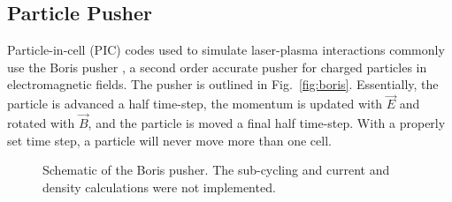 \documentclass[]{article}
\begin{document}
\subsection{Particle Pusher}
Particle-in-cell (PIC) codes used to simulate laser-plasma interactions commonly use the Boris pusher \cite{bird}, a second order accurate pusher for charged particles in electromagnetic fields.  The pusher is outlined in Fig.~\ref{fig:boris}.  Essentially, the particle is advanced a half time-step, the momentum is updated with $\vec{E}$ and rotated with $\vec{B}$, and the particle is moved a final half time-step.  With a properly set time step, a particle will never move more than one cell.


\begin{figure}[htbp]
\centering
\caption{Schematic of the Boris pusher.  The sub-cycling and current and density calculations were not implemented.}
\end{figure}
\end{document}
